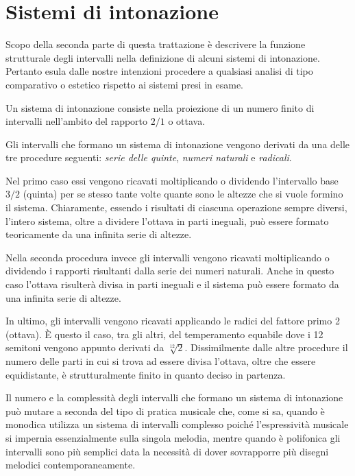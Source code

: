 \chapter{Sistemi di intonazione}

Scopo della seconda parte di questa trattazione è descrivere la funzione
strutturale degli intervalli nella definizione di alcuni sistemi di
intonazione. Pertanto esula dalle nostre intenzioni procedere a qualsiasi
analisi di tipo comparativo o estetico rispetto ai sistemi presi in esame.

Un sistema di intonazione consiste nella proiezione di un numero finito di
intervalli nell'ambito del rapporto $2/1$ o ottava.

Gli intervalli che formano un sistema di intonazione vengono derivati da una
delle tre procedure seguenti: \emph{serie delle quinte}, \emph{numeri naturali}
e \emph{radicali}.

Nel primo caso essi vengono ricavati moltiplicando o dividendo l'intervallo
base $3/2$ (quinta) per se stesso tante volte quante sono le altezze che si
vuole formino il sistema. Chiaramente, essendo i risultati di ciascuna
operazione sempre diversi, l'intero sistema, oltre a dividere l'ottava in parti
ineguali, può essere formato teoricamente da una infinita serie di altezze.

Nella seconda procedura invece gli intervalli vengono ricavati moltiplicando o
dividendo i rapporti risultanti dalla serie dei numeri naturali. Anche in
questo caso l'ottava risulterà divisa in parti ineguali e il sistema può essere
formato da una infinita serie di altezze.

In ultimo, gli intervalli vengono ricavati applicando le radici del fattore
primo 2 (ottava). È questo il caso, tra gli altri, del temperamento equabile
dove i 12 semitoni vengono appunto derivati da $\sqrt[12]{2}$. Dissimilmente
dalle altre procedure il numero delle parti in cui si trova ad essere divisa
l'ottava, oltre che essere equidistante, è strutturalmente finito in quanto
deciso in partenza.

Il numero e la complessità degli intervalli che formano un sistema di
intonazione può mutare a seconda del tipo di pratica musicale che, come si sa,
quando è monodica utilizza un sistema di intervalli complesso poiché
l'espressività musicale si impernia essenzialmente sulla singola melodia,
mentre quando è polifonica gli intervalli sono più semplici data la necessità
di dover sovrapporre più disegni melodici contemporaneamente.

